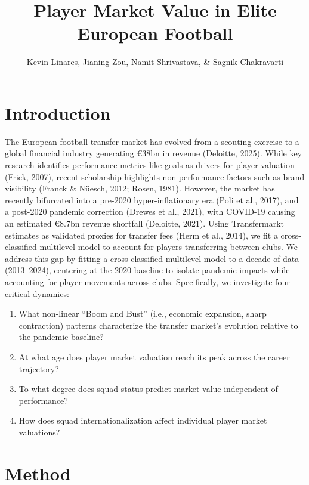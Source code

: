 \documentclass[
  12pt,
]{article}
\title{Player Market Value in Elite European Football}
\author{Kevin Linares, Jianing Zou, Namit Shrivastava, \& Sagnik
Chakravarti}
\date{}
\providecommand{\tightlist}{%
  \setlength{\itemsep}{0pt}\setlength{\parskip}{0pt}}\usepackage{longtable,booktabs,array}
\begin{document}
\maketitle


\vspace{-1.5cm}

\section{Introduction}\label{introduction}

The European football transfer market has evolved from a scouting
exercise to a global financial industry generating €38bn in revenue
(Deloitte, 2025). While key research identifies performance metrics like
goals as drivers for player valuation (Frick, 2007), recent scholarship
highlights non-performance factors such as brand visibility (Franck \&
Nüesch, 2012; Rosen, 1981). However, the market has recently bifurcated
into a pre-2020 hyper-inflationary era (Poli et al., 2017), and a
post-2020 pandemic correction (Drewes et al., 2021), with COVID-19
causing an estimated €8.7bn revenue shortfall (Deloitte, 2021). Using
Transfermarkt estimates as validated proxies for transfer fees (Herm et
al., 2014), we fit a cross-classified multilevel model to account for
players transferring between clubs. We address this gap by fitting a
cross-classified multilevel model to a decade of data (2013--2024),
centering at the 2020 baseline to isolate pandemic impacts while
accounting for player movements across clubs. Specifically, we
investigate four critical dynamics:

\begin{enumerate}
\def\labelenumi{\arabic{enumi}.}
\tightlist
\item
  What non-linear ``Boom and Bust'' (i.e., economic expansion, sharp
  contraction) patterns characterize the transfer market's evolution
  relative to the pandemic baseline?
\item
  At what age does player market valuation reach its peak across the
  career trajectory?
\item
  To what degree does squad status predict market value independent of
  performance?
\item
  How does squad internationalization affect individual player market
  valuations?
\end{enumerate}

\section{Method}\label{method}
\end{document}
